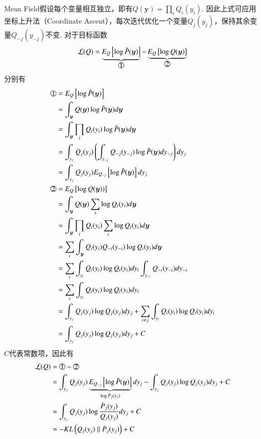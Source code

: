 Mean Field假设每个变量相互独立，即有$Q(\boldsymbol{y})=\prod_i{Q_i(y_i)}$.
因此上式可应用坐标上升法（Coordinate Ascent），每次迭代优化一个变量$Q_j(y_j)$，保持其余变量$Q_{-j}(y_{-j})$不变.
对于目标函数
\begin{equation}
	\mathcal{L}(Q)=\underbrace{E_{Q}\left[\log \tilde{P}(\boldsymbol{y})\right]}_{\tcircle{1}}-\underbrace{E_{Q}\left[\log Q(\boldsymbol{y})\right]}_{\tcircle{2}}
\end{equation}
分别有
\begin{equation}
	\begin{split}
		\tcircle{1}&=E_{Q}\left[\log \tilde{P}(\boldsymbol{y})\right]\\
		&=\int_{\boldsymbol{y}}Q(\boldsymbol{y}) \log \tilde{P}(\boldsymbol{y})d\boldsymbol{y}\\
		&=\int_{\boldsymbol{y}}\prod_i{Q_i(y_i)} \log \tilde{P}(\boldsymbol{y})d\boldsymbol{y}\\
		&=\int_{y_j}Q_j(y_j)\left(\int_{y_{-j}}Q_{-j}(y_{-j})\log \tilde{P}(\boldsymbol{y}) dy_{-j}\right) dy_j\\
		&=\int_{y_j}Q_j(y_j)E_{Q_{-j}}\left[\log \tilde{P}(\boldsymbol{y}) \right] dy_j\\
		\tcircle{2}&=E_{Q}\left[\log Q(\boldsymbol{y}))\right]\\
		&=\int_{\boldsymbol{y}}Q(\boldsymbol{y}) \sum_i\log Q_i(y_i) d\boldsymbol{y}\\
		&=\int_{\boldsymbol{y}}\prod_i{Q_i(y_i)} \sum_i\log Q_i(y_i) d\boldsymbol{y}\\
		&=\sum_i\int_{\boldsymbol{y}}Q_i(y_i)Q_{-i}(y_{-i})\log Q_i(y_i) d\boldsymbol{y}\\
		&=\sum_i\int_{y_i}Q_i(y_i)\log Q_i(y_i) dy_i\int_{y_{-i}} {Q_{-i}(y_{-i})}dy_{-i}\\
		&=\sum_i\int_{y_i}Q_i(y_i)\log Q_i(y_i) dy_i\\
		&=\int_{y_j}Q_j(y_j)\log Q_j(y_j) dy_j + \sum_{i\neq j}\int_{y_i}Q_i(y_i)\log Q_i(y_i) dy_i  \\
		&=\int_{y_j}Q_j(y_j)\log Q_j(y_j) dy_j + C
	\end{split}
\end{equation}
$C$代表常数项，因此有
\begin{equation}
	\begin{split}
		\mathcal{L}(Q)&=\tcircle{1}-\tcircle{2}\\
		&=\int_{y_j}Q_j(y_j)\underbrace{E_{Q_{-j}}\left[\log \tilde{P}(\boldsymbol{y}) \right]}_{\log \dot{P}_j(y_j)} dy_j-\int_{y_j}Q_j(y_j)\log Q_j(y_j) dy_j +C\\
		&=\int_{y_j}Q_j(y_j)\log\frac{\dot{P}_j(y_j)}{Q_j(y_j)} dy_j +C\\
		&=-KL\left(Q_j(y_j)\parallel \dot{P}_j(y_j)\right)+C
	\end{split}
\end{equation}
